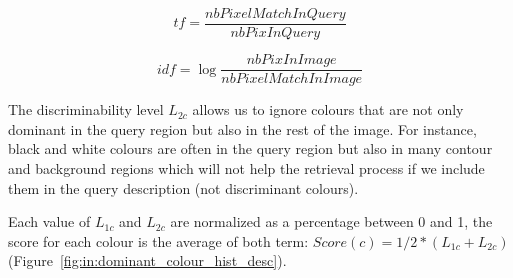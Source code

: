 


\begin{equation}
   tf = \frac{nbPixelMatchInQuery}{nbPixInQuery}
   \label{eq:query_colors_tf}  
  \end{equation}

\begin{equation}
 idf = \log \frac{nbPixInImage}{nbPixelMatchInImage}
   \label{eq:in:query_colors_idf}  
  \end{equation}

The discriminability level $L_{2c}$ allows us to ignore colours that are not only dominant in the query region but also in the rest of the image.
For instance, black and white colours are often in the query region but also in many contour and background regions which will not help the retrieval process if we include them in the query description (not discriminant colours).

Each value of $L_{1c}$ and $L_{2c}$ are normalized as a percentage between 0 and 1, the score for each colour is the average of both term: $Score(c) = 1/2 * (L_{1c} + L_{2c})$ (Figure~\ref{fig:in:dominant_colour_hist_desc}).





